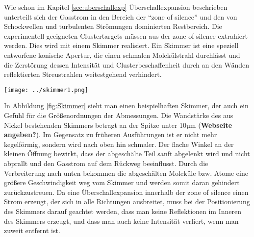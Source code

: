Wie schon im Kapitel \ref{sec:uberschallexp} Überschallexpansion beschrieben unterteilt sich der Gasstrom in den Bereich der \enquote{zone of silence} und den von Schockwellen und turbulenten Strömungen dominierten Restbereich. Die experimentell geeigneten Clustertargets müssen aus der zone of silence extrahiert werden. Dies wird mit einem Skimmer realisiert. Ein Skimmer ist eine speziell entworfene konische Apertur, die einen schmalen Molekülstrahl durchlässt und die Zerstörung dessen Intensität und Clusterbeschaffenheit durch an den Wänden reflektierten Streustrahlen weitestgehend verhindert. 
\begin{center}
\begin{minipage}{\linewidth}
\centering
\texttt{[image: ../skimmer1.png]}%
 \label{fig:Skimmer}
\end{minipage} 
\end{center} 
In Abbildung \ref{fig:Skimmer} sieht man einen beispielhaften Skimmer, der auch ein Gefühl für die Größenordnungen der Abmessungen. Die Wandstärke des aus Nickel bestehenden Skimmers betragt an der Spitze unter 10µm (\textbf{Webseite angeben?}). Im Gegensatz zu früheren Ausführungen ist er nicht mehr kegelförmig, sondern wird nach oben hin schmaler. Der flache Winkel an der kleinen Öffnung bewirkt, dass der abgeschälte Teil sanft abgelenkt wird und nicht abprallt und den Gasstrom auf dem Rückweg beeinflusst. Durch die Verbreiterung nach unten bekommen die abgeschälten Moleküle bzw. Atome eine größere Geschwindigkeit weg vom Skimmer und werden somit daran gehindert zurückzustreuen.
Da eine Überschallexpansion innerhalb der zone of silence einen Strom erzeugt, der sich in alle Richtungen ausbreitet, muss bei der Positionierung des Skimmers darauf geachtet werden, dass man keine Reflektionen im Inneren des Skimmers erzeugt, und dass man auch keine Intensität verliert, wenn man zuweit entfernt ist.

